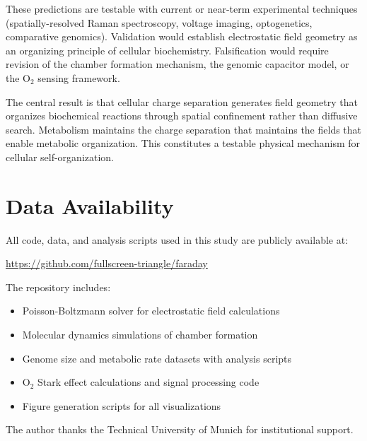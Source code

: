 \documentclass[twocolumn,10pt,aps,prd,superscriptaddress,floatfix,nofootinbib]{revtex4-2}
\theoremstyle{remark}
\begin{document}
These predictions are testable with current or near-term experimental techniques (spatially-resolved Raman spectroscopy, voltage imaging, optogenetics, comparative genomics). Validation would establish electrostatic field geometry as an organizing principle of cellular biochemistry. Falsification would require revision of the chamber formation mechanism, the genomic capacitor model, or the O$_2$ sensing framework.

The central result is that cellular charge separation generates field geometry that organizes biochemical reactions through spatial confinement rather than diffusive search. Metabolism maintains the charge separation that maintains the fields that enable metabolic organization. This constitutes a testable physical mechanism for cellular self-organization.

\section*{Data Availability}
All code, data, and analysis scripts used in this study are publicly available at:

\begin{center}
\url{https://github.com/fullscreen-triangle/faraday}
\end{center}

\noindent The repository includes:
\begin{itemize}
    \item Poisson-Boltzmann solver for electrostatic field calculations
    \item Molecular dynamics simulations of chamber formation
    \item Genome size and metabolic rate datasets with analysis scripts
    \item O$_2$ Stark effect calculations and signal processing code
    \item Figure generation scripts for all visualizations
\end{itemize}

\begin{acknowledgments}
The author thanks the Technical University of Munich for institutional support.
\end{acknowledgments}


\end{document}
